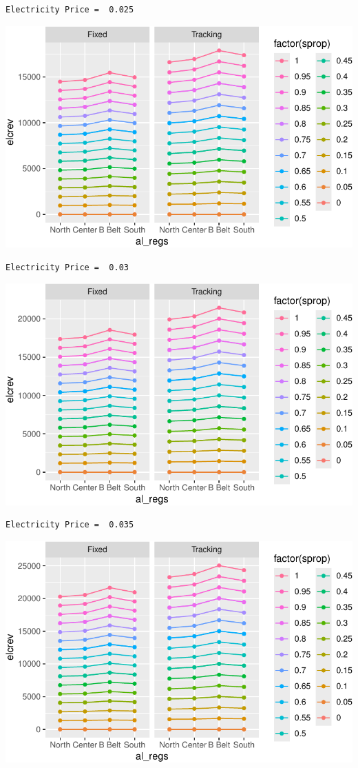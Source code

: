 \documentclass[
  letterpaper,
  DIV=11,
  numbers=noendperiod]{scrartcl}
\begin{document}
\begin{verbatim}
Electricity Price =  0.025
\end{verbatim}

\includegraphics{Simulation_files/figure-pdf/unnamed-chunk-21-4.pdf}

\begin{verbatim}
Electricity Price =  0.03
\end{verbatim}

\includegraphics{Simulation_files/figure-pdf/unnamed-chunk-21-5.pdf}

\begin{verbatim}
Electricity Price =  0.035
\end{verbatim}

\includegraphics{Simulation_files/figure-pdf/unnamed-chunk-21-6.pdf}
\end{document}
